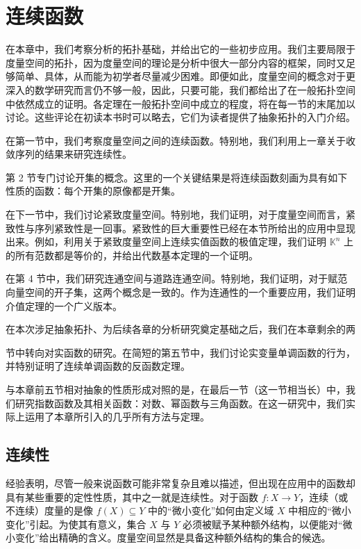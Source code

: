\chapter{连续函数}
在本章中，我们考察分析的拓扑基础，并给出它的一些初步应用。我们主要局限于度量空间的拓扑，因为度量空间的理论是分析中很大一部分内容的框架，同时又足够简单、具体，从而能为初学者尽量减少困难。即便如此，度量空间的概念对于更深入的数学研究而言仍不够一般，因此，只要可能，我们都给出了在一般拓扑空间中依然成立的证明。各定理在一般拓扑空间中成立的程度，将在每一节的末尾加以讨论。这些评论在初读本书时可以略去，它们为读者提供了抽象拓扑的入门介绍。

在第一节中，我们考察度量空间之间的连续函数。特别地，我们利用上一章关于收敛序列的结果来研究连续性。

第 2 节专门讨论开集的概念。这里的一个关键结果是将连续函数刻画为具有如下性质的函数：每个开集的原像都是开集。

在下一节中，我们讨论紧致度量空间。特别地，我们证明，对于度量空间而言，紧致性与序列紧致性是一回事。紧致性的巨大重要性已经在本节所给出的应用中显现出来。例如，利用关于紧致度量空间上连续实值函数的极值定理，我们证明 $ \mathbb{K}^n $ 上的所有范数都是等价的，并给出代数基本定理的一个证明。

在第 4 节中，我们研究连通空间与道路连通空间。特别地，我们证明，对于赋范向量空间的开子集，这两个概念是一致的。作为连通性的一个重要应用，我们证明介值定理的一个广义版本。

在本次涉足抽象拓扑、为后续各章的分析研究奠定基础之后，我们在本章剩余的两

节中转向对实函数的研究。在简短的第五节中，我们讨论实变量单调函数的行为，并特别证明了连续单调函数的反函数定理。

与本章前五节相对抽象的性质形成对照的是，在最后一节（这一节相当长）中，我们研究指数函数及其相关函数：对数、幂函数与三角函数。在这一研究中，我们实际上运用了本章所引入的几乎所有方法与定理。

\section{连续性}

经验表明，尽管一般来说函数可能非常复杂且难以描述，但出现在应用中的函数却具有某些重要的定性性质，其中之一就是连续性。对于函数 $ f: X \to Y $，连续（或不连续）度量的是像 $ f(X) \subseteq Y $ 中的“微小变化”如何由定义域 $ X $ 中相应的“微小变化”引起。为使其有意义，集合 $ X $ 与 $ Y $ 必须被赋予某种额外结构，以便能对“微小变化”给出精确的含义。度量空间显然是具备这种额外结构的集合的候选。

